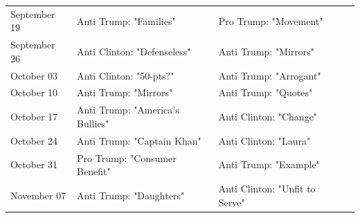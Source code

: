 \begin{table}[!h]
{\begin{tabular}[t]{llll}
September 19 & Anti Trump: "Families" & Pro Trump: "Movement" & \\
September 26 & Anti Clinton: "Defenseless" & Anti Trump: "Mirrors" & \\
October 03 & Anti Clinton: "50-pts?" & Anti Trump: "Arrogant" & \\
October 10 & Anti Trump: "Mirrors" & Anti Trump: "Quotes" & \\
\addlinespace
October 17 & Anti Trump: "America's Bullies" & Anti Clinton: "Change" & \\
October 24 & Anti Trump: "Captain Khan" & Anti Clinton: "Laura" & \\
October 31 & Pro Trump: "Consumer Benefit" & Anti Trump: "Example" & \\
November 07 & Anti Trump: "Daughters" & Anti Clinton: "Unfit to Serve" & \\
\bottomrule
\end{tabular}}
\end{table}
